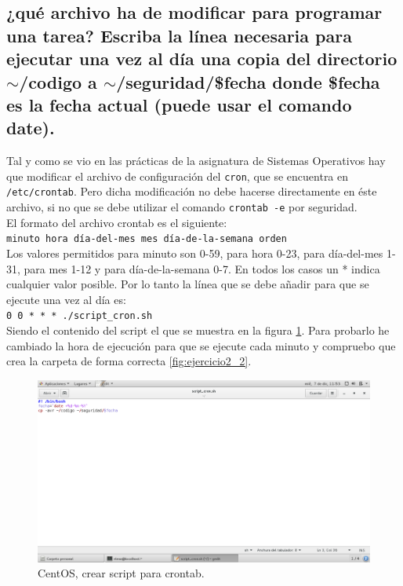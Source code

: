 \subsection{¿qué archivo ha de modificar para programar una tarea? Escriba la línea necesaria para ejecutar una vez al día una copia del directorio $\sim$/codigo a $\sim$/seguridad/\$fecha donde \$fecha es la fecha actual (puede usar el comando date).}

Tal y como se vio en las prácticas de la asignatura de Sistemas Operativos hay que modificar el archivo de configuración del \texttt{cron}, que se encuentra en \texttt{/etc/crontab}. Pero dicha modificación no debe hacerse directamente en éste archivo, si no que se debe utilizar el comando \texttt{crontab -e} por seguridad.\\
El formato del archivo crontab es el siguiente:\\
\texttt{minuto \hspace{0.5cm} hora  \hspace{0.5cm} día-del-mes \hspace{0.5cm} mes \hspace{0.5cm} día-de-la-semana  \hspace{0.5cm} orden}\\
Los valores permitidos para minuto son 0-59, para hora 0-23, para día-del-mes 1-31, para mes 1-12 y para día-de-la-semana 0-7. En todos los casos un * indica cualquier valor posible. Por lo tanto la línea que se debe añadir para que se ejecute una vez al día es:\\
\texttt{0 \hspace{0.5cm} 0 \hspace{0.5cm} * \hspace{0.5cm} * \hspace{0.5cm} * \hspace{0.5cm} ./script\_cron.sh}\\
Siendo el contenido del script el que se muestra en la figura \ref{fig:ejercicio2-1}. Para probarlo he cambiado la hora de ejecución para que se ejecute cada minuto y compruebo que crea la carpeta de forma correcta \ref{fig:ejercicio2_2}.

\begin{figure}[H] 
	\centering
	\includegraphics[width=14.7cm]{./img/ejercicio2-1.png} 	
	\caption{CentOS, crear script para crontab.} \label{fig:ejercicio2-1}
\end{figure}

